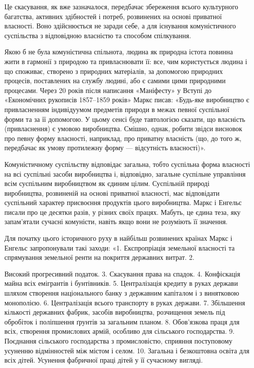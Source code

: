 \documentclass[12pt,a4paper,openany]{book}
\begin{document}
Це скасування, як вже зазначалося, передбачає збереження всього культурного багатства, активних здібностей і потреб, розвинених на основі приватної власності. Воно здійснюється не заради себе, а для існування комуністичного суспільства з відповідною власністю та способом спілкування.

Якою б не була комуністична спільнота, людина як природна істота повинна жити в гармонії з природою та привласнювати її: все, чим користується людина і що споживає, створено з природних матеріалів, за допомогою природних процесів, поставлених на службу людині, або є самими цими природними процесами. Через 20 років після написання «Маніфесту» у Вступі до «Економічних рукописів 1857–1859 років» Маркс писав: «Будь-яке виробництво є привласненням індивідуумом предметів природи в межах певної суспільної форми та за її допомогою. У цьому сенсі буде тавтологією сказати, що власність (привласнення) є умовою виробництва. Смішно, однак, робити звідси висновок про певну форму власності, наприклад, про приватну власність (що, до того ж, передбачає як умову протилежну форму — відсутність власності)».

Комуністичному суспільству відповідає загальна, тобто суспільна форма власності на всі суспільні засоби виробництва і, відповідно, загальне суспільне управління всім суспільним виробництвом як єдиним цілим. Суспільній природі виробництва, розвиненій на основі приватної власності, має відповідати суспільний характер присвоєння продуктів цього виробництва. Маркс і Енгельс писали про це десятки разів, у різних своїх працях. Мабуть, це єдина теза, яку запам’ятали сучасні комуністи, навіть якщо вони не розуміють її значення.

Для початку цього історичного руху в найбільш розвинених країнах Маркс і Енгельс запропонували такі заходи: «1. Експропріація земельної власності та спрямування земельної ренти на покриття державних витрат. 2.

Високий прогресивний податок. 3. Скасування права на спадок. 4. Конфіскація майна всіх емігрантів і бунтівників. 5. Централізація кредиту в руках держави шляхом створення національного банку з державним капіталом і з винятковою монополією. 6. Централізація всього транспорту в руках держави. 7. Збільшення кількості державних фабрик, засобів виробництва, розчищення земель під обробіток і поліпшення ґрунтів за загальним планом. 8. Обов’язкова праця для всіх, створення промислових армій, особливо для сільського господарства. 9. Поєднання сільського господарства з промисловістю, сприяння поступовому усуненню відмінностей між містом і селом. 10. Загальна і безкоштовна освіта для всіх дітей. Усунення фабричної праці дітей у її сучасному вигляді.
\end{document}
